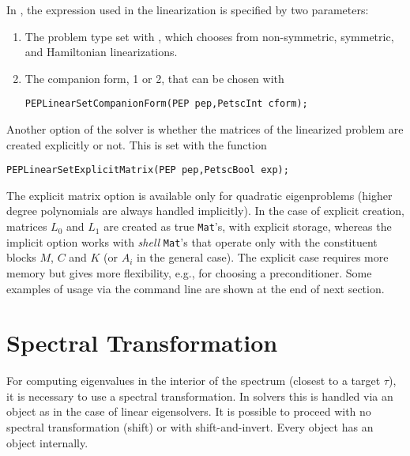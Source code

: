 In , the expression used in the linearization is specified by two parameters:
\begin{enumerate}
\item The problem type set with , which chooses from non-symmetric, symmetric, and Hamiltonian linearizations.
\item The companion form, 1 or 2, that can be chosen with
	\begin{Verbatim}[fontsize=\small]
   PEPLinearSetCompanionForm(PEP pep,PetscInt cform);
	\end{Verbatim}
\end{enumerate}

Another option of the  solver is whether the matrices of the linearized problem are created explicitly or not. This is set with the function
	\begin{Verbatim}[fontsize=\small]
	PEPLinearSetExplicitMatrix(PEP pep,PetscBool exp);
	\end{Verbatim}
The explicit matrix option is available only for quadratic eigenproblems (higher degree polynomials are always handled implicitly). In the case of explicit creation, matrices $L_0$ and $L_1$ are created as true \texttt{Mat}'s, with explicit storage, whereas the implicit option works with \emph{shell} \texttt{Mat}'s that operate only with the constituent blocks $M$, $C$ and $K$ (or $A_i$ in the general case). The explicit case requires more memory but gives more flexibility, e.g., for choosing a preconditioner. Some examples of usage via the command line are shown at the end of next section.

\section{\label{sec:qst}Spectral Transformation}

For computing eigenvalues in the interior of the spectrum (closest to a target $\tau$), it is necessary to use a spectral transformation. In  solvers this is handled via an  object as in the case of linear eigensolvers. It is possible to proceed with no spectral transformation (shift) or with shift-and-invert. Every  object has an  object internally.

